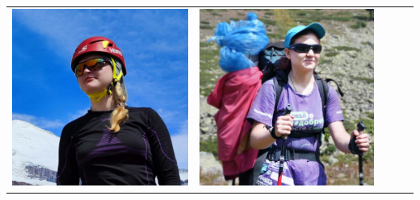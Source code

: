\documentclass[
11pt, %
]{beamer}
\newcommand\rozhasize{0.17\textwidth}
\begin{document}
\begin{frame}
\begin{tabular}{ccccc}
\begin{minipage}{\rozhasize}
		\includegraphics[width=\textwidth]{../pics/portraits/dasha_k}
	\end{minipage} &
	\begin{minipage}{\rozhasize}
		\includegraphics[width=\textwidth]{../pics/portraits/masha2}

\end{minipage}
\end{tabular}
\end{frame}
\end{document}
